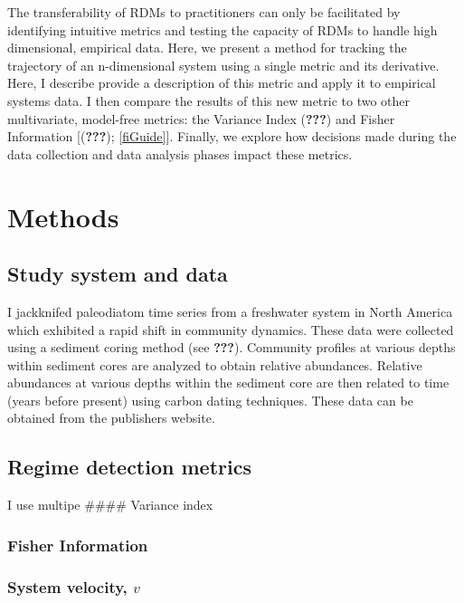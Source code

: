 \documentclass[12pt,twoside,openany]{reedthesis}
\begin{document}
The transferability of RDMs to practitioners can only be facilitated by
identifying intuitive metrics and testing the capacity of RDMs to handle
high dimensional, empirical data. Here, we present a method for tracking
the trajectory of an n-dimensional system using a single metric and its
derivative. Here, I describe provide a description of this metric and
apply it to empirical systems data. I then compare the results of this
new metric to two other multivariate, model-free metrics: the Variance
Index ({\textbf{???}}) and Fisher Information {[}({\textbf{???}});
\ref{fiGuide}{]}. Finally, we explore how decisions made during the data
collection and data analysis phases impact these metrics.

\section{Methods}\label{methods-1}

\subsection{Study system and data}\label{study-system-and-data}

I jackknifed paleodiatom time series from a freshwater system in North
America which exhibited a rapid shift in community dynamics. These data
were collected using a sediment coring method (see {\textbf{???}}).
Community profiles at various depths within sediment cores are analyzed
to obtain relative abundances. Relative abundances at various depths
within the sediment core are then related to time (years before present)
using carbon dating techniques. These data can be obtained from the
publishers website.

\subsection{Regime detection metrics}\label{regime-detection-metrics}

I use multipe \#\#\#\# Variance index

\subsubsection{Fisher Information}\label{fisher-information}

\subsubsection{\texorpdfstring{System velocity,
\(v\)}{System velocity, v}}\label{system-velocity-v}
\end{document}
